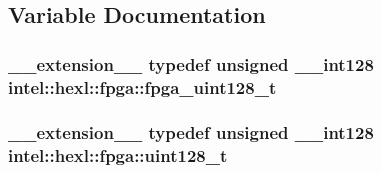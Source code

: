 \subsection{Variable Documentation}
\hypertarget{namespaceintel_1_1hexl_1_1fpga_abec5370ea5966ed3c9aee7817e805337}{
\subsubsection[{fpga\-\_\-uint128\-\_\-t}]{\setlength{\rightskip}{0pt plus 5cm}\-\_\-\-\_\-extension\-\_\-\-\_\- typedef unsigned \-\_\-\-\_\-int128 intel\-::hexl\-::fpga\-::fpga\-\_\-uint128\-\_\-t}}\label{namespaceintel_1_1hexl_1_1fpga_abec5370ea5966ed3c9aee7817e805337}
\hypertarget{namespaceintel_1_1hexl_1_1fpga_a855c40574416e25f94fb6b7817c2c4f3}{
\subsubsection[{uint128\-\_\-t}]{\setlength{\rightskip}{0pt plus 5cm}\-\_\-\-\_\-extension\-\_\-\-\_\- typedef unsigned \-\_\-\-\_\-int128 intel\-::hexl\-::fpga\-::uint128\-\_\-t}}\label{namespaceintel_1_1hexl_1_1fpga_a855c40574416e25f94fb6b7817c2c4f3}
